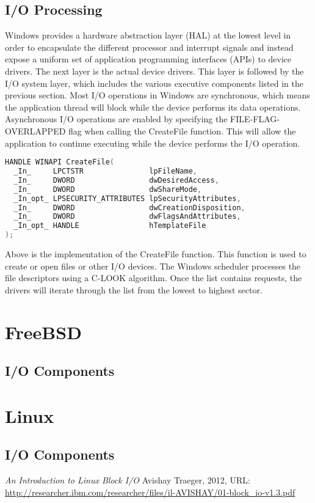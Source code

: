 \documentclass[letterpaper,draftclsnofoot,10pt,onecolumn,titlepage]{IEEEtran}\usepackage[margin=0.75in]{geometry}
\begin{document}
\subsection{I/O Processing}
Windows provides a hardware abstraction layer (HAL) at the lowest level in order to encapsulate the different
processor and interrupt signals and instead expose a uniform set of application programming interfaces (APIs)
to device drivers. The next layer is the actual device drivers. This layer is followed by the I/O system
layer, which includes the various executive components listed in the previous section. Most I/O
operations in Windows are synchronous, which means the application thread will block while the device
performs its data operations. Asynchronous I/O operations are enabled by specifying the FILE-FLAG-OVERLAPPED
flag when calling the CreateFile function. This will allow the application to continue executing while the
device performs the I/O operation.

\begin{lstlisting}[language=C++]
HANDLE WINAPI CreateFile(
  _In_     LPCTSTR               lpFileName,
  _In_     DWORD                 dwDesiredAccess,
  _In_     DWORD                 dwShareMode,
  _In_opt_ LPSECURITY_ATTRIBUTES lpSecurityAttributes,
  _In_     DWORD                 dwCreationDisposition,
  _In_     DWORD                 dwFlagsAndAttributes,
  _In_opt_ HANDLE                hTemplateFile
); 
\end{lstlisting}

Above is the implementation of the CreateFile function. This function is used to create or open files or
other I/O devices. The Windows scheduler processes the file descriptors using a C-LOOK algorithm. Once
the list contains requests, the drivers will iterate through the list from the lowest to highest sector.

\section{FreeBSD}

\subsection{I/O Components}


\section{Linux}

\subsection{I/O Components}


\begin{thebibliography}{1}

    \textit{An Introduction to Linux Block I/O}
    Avishay Traeger, 2012, URL: \url{http://researcher.ibm.com/researcher/files/il-AVISHAY/01-block_io-v1.3.pdf}

\end{thebibliography}
\end{document}
